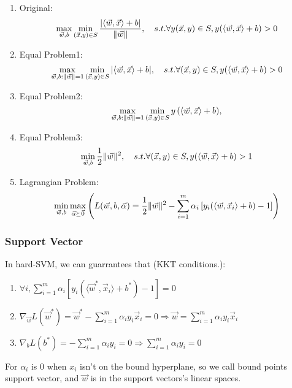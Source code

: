 \begin{enumerate}
    \item Original:
        \[
            \max_{ \vec{w} , b} \min_{ ( \vec{x} , y) \in S } \frac{ \left| \langle \vec{w} , \vec{x}  \rangle  + b \right|}{ \Arrowvert \vec{w}  \Arrowvert },
            \quad s.t.
            \forall y( \vec{x} , y) \in S, y(\langle \vec{w} , \vec{x}  \rangle  + b) > 0
        \]
    \item Equal Problem1:
        \[
            \max_{ \vec{w} , b : \Arrowvert \vec{w}  \Arrowvert = 1} \min_{ ( \vec{x} , y) \in S } { \left| \langle \vec{w} , \vec{x}  \rangle  + b \right|},
            \quad s.t.
            \forall ( \vec{x} , y) \in S, y(\langle \vec{w} , \vec{x}  \rangle  + b) > 0
        \]
    \item Equal Problem2:
        \[
            \max_{ \vec{w} , b : \Arrowvert \vec{w}  \Arrowvert = 1} \min_{ ( \vec{x} , y) \in S } { y \left( \langle \vec{w} , \vec{x}  \rangle  + b \right)},
        \]
    \item Equal Problem3:
        \[
            \min_{ \vec{w} , b} \frac{1}{2} \Arrowvert \vec{w}  \Arrowvert^2,
            \quad s.t.
            \forall ( \vec{x} , y) \in S, y(\langle \vec{w} , \vec{x}  \rangle  + b) > 1
        \]
    \item Lagrangian Problem:
        \[
            \min_{\vec{w}, b} \max_{\vec{\alpha} \succeq \vec{0}} \left(L(\vec{w}, b, \vec{\alpha}) = \frac{1}{2} \Arrowvert \vec{w} \Arrowvert^2 - \sum^{m}_{i=1} \alpha_i \left[ y_i( \langle \vec{w}, \vec{x}_i \rangle + b) - 1 \right] \right)
        \]
\end{enumerate}

\subsubsection{Support Vector}%
\label{ssub:support_vector}

In hard-SVM, we can guarrantees that
(KKT conditions.):
\begin{enumerate}
    \item $ \forall i, \sum^{m}_{i=1} \alpha_i \left[ y_i( \langle \vec{w}^*, \vec{x}_i \rangle + b^*) - 1 \right] = 0 $
    \item $ \nabla_{\vec{w}} L(\vec{w}^*) = \vec{w}^* - \sum^{m}_{i=1} \alpha_i y_i \vec{x}_i = 0 \Rightarrow \vec{w} = \sum^{m}_{i=1} \alpha_i y_i \vec{x}_i $ 
    \item $ \nabla_b L(b^*) = - \sum^{m}_{i=1} \alpha_i y_i = 0 \Rightarrow \sum^{m}_{i=1} \alpha_i y_i  = 0 $
\end{enumerate}
For $ \alpha_i $ is 0 when $ x_i $ isn't on the bound hyperplane, so we call bound points support vector, and $ \vec{w} $ is in the support vectors's linear spaces.

